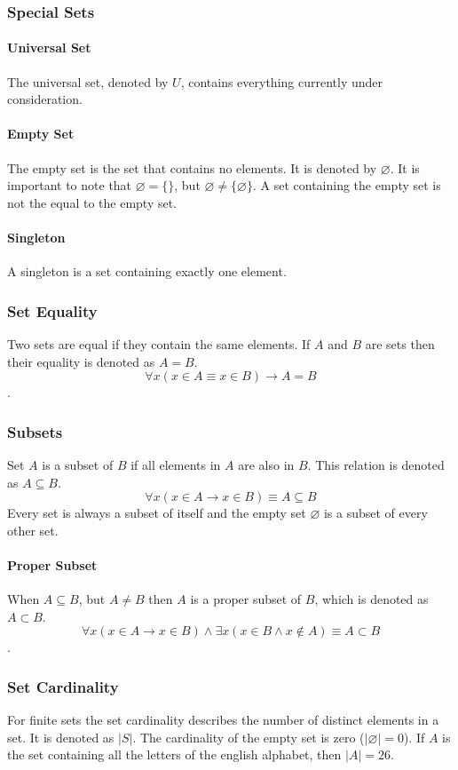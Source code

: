 \documentclass[a4paper, 10pt]{article}
\begin{document}
\subsubsection{Special Sets}
\paragraph{Universal Set}
The universal set, denoted by \(U\), contains everything currently under consideration.

\paragraph{Empty Set}
The empty set is the set that contains no elements. It is denoted by \(\varnothing\). It is important to note that \(\varnothing = \{\}\), but \( \varnothing \neq \{\varnothing\} \). A set containing the empty set is not the equal to the empty set.

\paragraph{Singleton}
A singleton is a set containing exactly one element.

\subsubsection{Set Equality}
Two sets are equal if they contain the same elements. If \(A\) and \(B\) are sets then their equality is denoted as \(A = B\).
\[ \forall x(x\in A \equiv x\in B)\rightarrow A=B \].

\newpage
\subsubsection{Subsets}
Set \(A\) is a subset of \(B\) if all elements in \(A\) are also in \(B\). This relation is denoted as \(A\subseteq B\).
\[\forall x(x\in A\rightarrow x\in B)\equiv A\subseteq B\]
Every set is always a subset of itself and the empty set \(\varnothing\) is a subset of every other set.
\paragraph{Proper Subset}
When \(A\subseteq B\), but \(A\neq B\) then \(A\) is a proper subset of \(B\), which is denoted as \(A\subset B\).
\[\forall x (x\in A\rightarrow x\in B)\land \exists x(x\in B\land x\notin A)\equiv A\subset B\].

\subsubsection{Set Cardinality}
For finite sets the set cardinality describes the number of distinct elements in a set. It is denoted as \(|S|\). The cardinality of the empty set is zero (\(|\varnothing| = 0\)). If \(A\) is the set containing all the letters of the english alphabet, then \(|A| = 26\).
\end{document}

